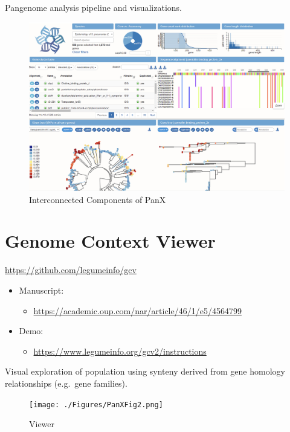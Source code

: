 \documentclass[
]{book}
\providecommand{\tightlist}{%
  \setlength{\itemsep}{0pt}\setlength{\parskip}{0pt}}
\begin{document}
Pangenome analysis pipeline and visualizations.

\begin{figure}
\centering
\includegraphics[width=1\textwidth,height=\textheight]{./Figures/PanXFig.png}
\caption{Interconnected Components of PanX}
\end{figure}

\hypertarget{genome-context-viewer}{%
\section{Genome Context Viewer}\label{genome-context-viewer}}

\url{https://github.com/legumeinfo/gcv}

\begin{itemize}
\tightlist
\item
  Manuscript:

  \begin{itemize}
  \tightlist
  \item
    \url{https://academic.oup.com/nar/article/46/1/e5/4564799}
  \end{itemize}
\item
  Demo:

  \begin{itemize}
  \tightlist
  \item
    \url{https://www.legumeinfo.org/gcv2/instructions}
  \end{itemize}
\end{itemize}

Visual exploration of population using synteny derived from gene homology relationships (e.g.~gene families).

\begin{figure}
\centering
\texttt{[image: ./Figures/PanXFig2.png]}
\caption{Viewer}
\end{figure}
\end{document}

